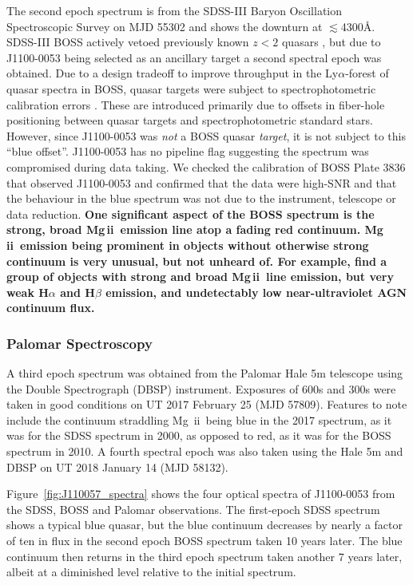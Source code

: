 \documentclass[a4paper,fleqn,usenatbib]{mnras}
\begin{document}
The second epoch spectrum is from the SDSS-III Baryon Oscillation
Spectroscopic Survey \citep[BOSS; ][]{Dawson2013} on MJD 55302 and
shows the downturn at $\lesssim$4300\AA. SDSS-III BOSS actively vetoed
previously known $z<2$ quasars \citep{Ross2012}, but due to J1100-0053
being selected as an ancillary target \citep[via a white dwarf
program;][]{Kepler2015, Kepler2016} a second spectral epoch was
obtained. Due to a design tradeoff to improve throughput in the
Ly$\alpha$-forest of quasar spectra in BOSS, quasar targets were subject
to spectrophotometric calibration errors \citep{Margala2016}. These
are introduced primarily due to offsets in fiber-hole positioning
between quasar targets and spectrophotometric standard stars. However,
since J1100-0053 was {\it not} a BOSS quasar {\it target}, it is not
subject to this ``blue offset''. J1100-0053 has no pipeline flag
suggesting the spectrum was compromised during data taking. We checked
the calibration of BOSS Plate 3836 that observed J1100-0053 and
confirmed that the data were high-SNR and that the behaviour in the
blue spectrum was not due to the instrument, telescope or data
reduction.  {\bf One significant aspect of the BOSS spectrum is the
strong, broad Mg\,{\sc ii}\ emission line atop a fading red continuum.
Mg\,{\sc ii}\ emission being prominent in objects without otherwise
strong continuum is very unusual, but not unheard of.  For example,
\citet{Roig2014} find a group of objects with strong and broad
Mg\,{\sc ii}\ line emission, but very weak H$\alpha$ and H$\beta$
emission, and undetectably low near-ultraviolet AGN continuum flux.}

\subsubsection{Palomar Spectroscopy} 
A third epoch spectrum was obtained from the Palomar Hale 5m telescope
using the Double Spectrograph (DBSP) instrument.  Exposures of 600s
and 300s were taken in good conditions on UT 2017 February 25 (MJD
57809). Features to note include the continuum straddling Mg\,{\sc
ii}\ being blue in the 2017 spectrum, as it was for the SDSS spectrum
in 2000, as opposed to red, as it was for the BOSS spectrum in 2010. A
fourth spectral epoch was also taken using the Hale 5m and DBSP on
UT 2018 January 14 (MJD 58132). 

Figure~\ref{fig:J110057_spectra} shows the four optical spectra of
J1100-0053 from the SDSS, BOSS and Palomar observations.  The first-epoch
SDSS spectrum shows a typical blue quasar, but the blue continuum
decreases by nearly a factor of ten in flux in the second epoch BOSS
spectrum taken 10 years later. The blue continuum then returns in the
third epoch spectrum taken another 7 years later, albeit at a
diminished level relative to the initial spectrum. 
\end{document}
